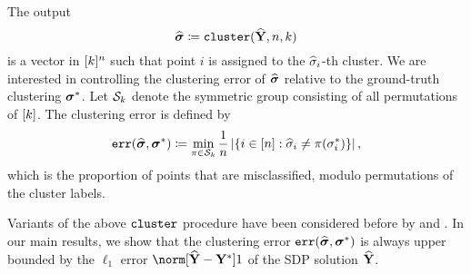 The output 
\[
\widehat{\boldsymbol{\sigma}}\coloneqq\texttt{cluster}(\widehat{\mathbf{Y}},n,k)
\]
is a vector in $[k]^{n}$ such that point $i$ is assigned
to the $\widehat{\sigma}_{i}$-th cluster. We are interested in controlling
the clustering error of $\widehat{\boldsymbol{\sigma}}$ relative to the ground-truth
clustering $\boldsymbol{\sigma}^{*}$. Let $\mathcal{S}_{k}$ denote the symmetric
group consisting of all permutations of $[k]$. The clustering
error is defined by
\begin{equation}
\operatorname*{\texttt{err}}(\widehat{\boldsymbol{\sigma}},\boldsymbol{\sigma}^{*})\coloneqq\min_{\pi\in\mathcal{S}_{k}}\frac{1}{n}\left|\left\{ i\in[n]:\widehat{\sigma}_{i}\neq\pi(\sigma^{*}_{i})\right\} \right|,\label{eq:mis_rate_def}
\end{equation}
which is the proportion of points that are misclassified, modulo permutations
of the cluster labels. 

Variants of the above $\texttt{cluster}$ procedure have been considered
before by \citet{makarychev2016learning} and \citet{mixon2017clustering}.
In our main results, we show that the clustering error $\operatorname*{\texttt{err}}(\widehat{\boldsymbol{\sigma}},\boldsymbol{\sigma}^{*})$
is always upper bounded by the $\ell_{1}$ error $\norm[\Yhat-\Ystar]1$
of the SDP solution $\widehat{\mathbf{Y}}$. 

 
